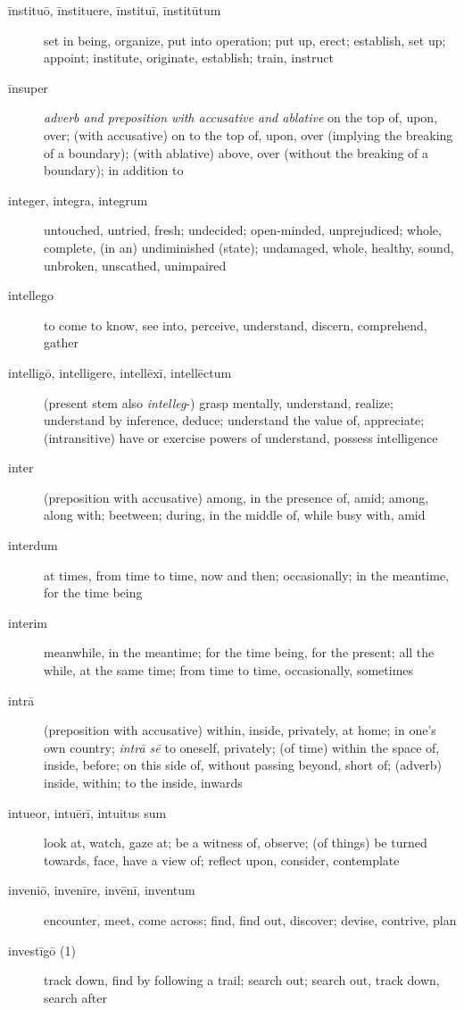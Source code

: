 \begin{description}
    \item[īnstituō, īnstituere, īnstituī, īnstitūtum] set in being, organize, put into operation; put up, erect; establish, set up; appoint; institute, originate, establish; train, instruct
    \item[īnsuper] \textit{adverb and preposition with accusative and ablative} on the top of, upon, over; (with accusative) on to the top of, upon, over (implying the breaking of a boundary); (with ablative) above, over (without the breaking of a boundary); in addition to
    \item[integer, integra, integrum] untouched, untried, fresh; undecided; open-minded, unprejudiced; whole, complete, (in an) undiminished (state); undamaged, whole, healthy, sound, unbroken, unscathed, unimpaired
    \item[intellego] to come to know, see into, perceive, understand, discern, comprehend, gather
    \item[intelligō, intelligere, intellēxī, intellēctum] (present stem also \textit{intelleg}-) grasp mentally, understand, realize; understand by inference, deduce; understand the value of, appreciate; (intransitive) have or exercise powers of understand, possess intelligence
    \item[inter] (preposition with accusative) among, in the presence of, amid; among, along with; beetween; during, in the middle of, while busy with, amid
    \item[interdum] at times, from time to time, now and then; occasionally; in the meantime, for the time being
    \item[interim] meanwhile, in the meantime; for the time being, for the present; all the while, at the same time; from time to time, occasionally, sometimes
    \item[intrā] (preposition with accusative) within, inside, privately, at home; in one's own country; \textit{intrā sē} to oneself, privately; (of time) within the space of, inside, before; on this side of, without passing beyond, short of; (adverb) inside, within; to the inside, inwards
    \item[intueor, intuērī, intuitus sum] look at, watch, gaze at; be a witness of, observe; (of things) be turned towards, face, have a view of; reflect upon, consider, contemplate
    \item[inveniō, invenīre, invēnī, inventum] encounter, meet, come across; find, find out, discover; devise, contrive, plan
    \item[investīgō (1)] track down, find by following a trail; search out; search out, track down, search after

\end{description}
